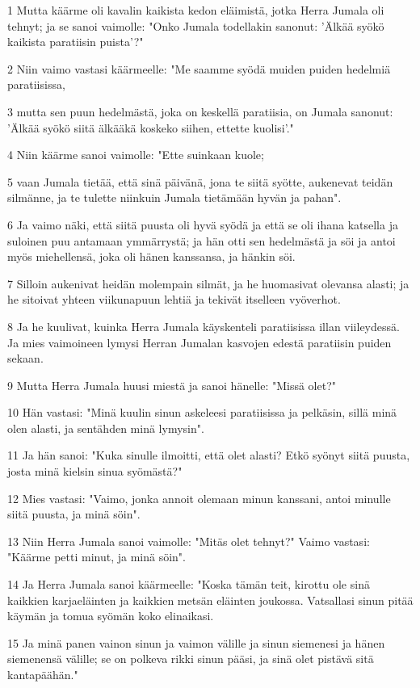 \par 1 Mutta käärme oli kavalin kaikista kedon eläimistä, jotka Herra Jumala oli tehnyt; ja se sanoi vaimolle: "Onko Jumala todellakin sanonut: 'Älkää syökö kaikista paratiisin puista'?"
\par 2 Niin vaimo vastasi käärmeelle: "Me saamme syödä muiden puiden hedelmiä paratiisissa,
\par 3 mutta sen puun hedelmästä, joka on keskellä paratiisia, on Jumala sanonut: 'Älkää syökö siitä älkääkä koskeko siihen, ettette kuolisi'."
\par 4 Niin käärme sanoi vaimolle: "Ette suinkaan kuole;
\par 5 vaan Jumala tietää, että sinä päivänä, jona te siitä syötte, aukenevat teidän silmänne, ja te tulette niinkuin Jumala tietämään hyvän ja pahan".
\par 6 Ja vaimo näki, että siitä puusta oli hyvä syödä ja että se oli ihana katsella ja suloinen puu antamaan ymmärrystä; ja hän otti sen hedelmästä ja söi ja antoi myös miehellensä, joka oli hänen kanssansa, ja hänkin söi.
\par 7 Silloin aukenivat heidän molempain silmät, ja he huomasivat olevansa alasti; ja he sitoivat yhteen viikunapuun lehtiä ja tekivät itselleen vyöverhot.
\par 8 Ja he kuulivat, kuinka Herra Jumala käyskenteli paratiisissa illan viileydessä. Ja mies vaimoineen lymysi Herran Jumalan kasvojen edestä paratiisin puiden sekaan.
\par 9 Mutta Herra Jumala huusi miestä ja sanoi hänelle: "Missä olet?"
\par 10 Hän vastasi: "Minä kuulin sinun askeleesi paratiisissa ja pelkäsin, sillä minä olen alasti, ja sentähden minä lymysin".
\par 11 Ja hän sanoi: "Kuka sinulle ilmoitti, että olet alasti? Etkö syönyt siitä puusta, josta minä kielsin sinua syömästä?"
\par 12 Mies vastasi: "Vaimo, jonka annoit olemaan minun kanssani, antoi minulle siitä puusta, ja minä söin".
\par 13 Niin Herra Jumala sanoi vaimolle: "Mitäs olet tehnyt?" Vaimo vastasi: "Käärme petti minut, ja minä söin".
\par 14 Ja Herra Jumala sanoi käärmeelle: "Koska tämän teit, kirottu ole sinä kaikkien karjaeläinten ja kaikkien metsän eläinten joukossa. Vatsallasi sinun pitää käymän ja tomua syömän koko elinaikasi.
\par 15 Ja minä panen vainon sinun ja vaimon välille ja sinun siemenesi ja hänen siemenensä välille; se on polkeva rikki sinun pääsi, ja sinä olet pistävä sitä kantapäähän."
